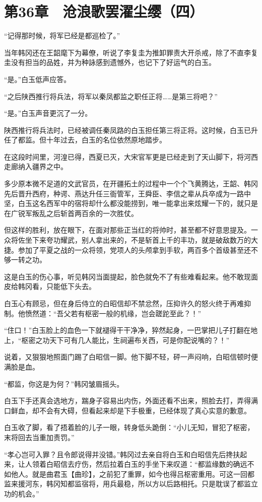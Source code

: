 \section{第36章　沧浪歌罢濯尘缨（四）}

“记得那时候，将军已经是都巡检了。”

当年韩冈还在王韶麾下为幕僚，听说了李复圭为推卸罪责大开杀戒，除了不直李复圭没有担当的品姓，并为种詠感到遗憾外，也记下了好运气的白玉。

“是。”白玉低声应答。

“之后陕西推行将兵法，将军以秦凤都监之职任正将……是第三将吧？”

“是。”白玉声音更沉了一分。

陕西推行将兵法时，已经被调任秦凤路的白玉担任第三将正将。这时候，白玉已升任了都监。但十年过去，白玉的名位依然原地踏步。

在这段时间里，河湟已得，西夏已灭，大宋官军更是已经走到了天山脚下，将河西走廊纳入疆界之中。

多少原本微不足道的文武官员，在开疆拓土的过程中一个个飞黄腾达，王韶、韩冈先后晋升西府，种谔、燕达升任三衙管军，王舜臣、李信之辈从兵卒成为一路中坚，白玉这名西军中的宿将却什么都没能捞到，唯一能拿出来炫耀一下的，就只是在广锐军叛乱之后斩首两百余的一次胜仗。

但这样的胜利，放在眼下，在面对那些正当红的将帅时，甚至都不好意思提及。一众将佐坐下来夸功耀武，别人拿出来的，不是斩首上千的丰功，就是破敌数万的大捷。参加了平夏之战的一众将领，党项人的头颅拿到手软，两百多个首级甚至还不够一转之功。

这是白玉的伤心事，听见韩冈当面提起，脸色就免不了有些难看起来。他不敢现面皮给韩冈看，只能低下头去。

白玉心有顾忌，但在身后侍立的白昭信却不禁忿然，压抑许久的怒火终于再难抑制。他愤然道：“吾父若有枢密一般的机缘，岂会蹉跎至此？！”

“住口！”白玉脸上的血色一下就褪得干干净净，猝然起身，一巴掌把儿子打翻在地上，“枢密之功天下可有几人能比，生祠遍布关西，可是你配说嘴的？！”

说着，又狠狠地照面门踢了白昭信一脚。他下脚不轻，砰一声闷响，白昭信顿时便满脸是血。

“都监，你这是为何？”韩冈皱眉摇头。

白玉下手还真会选地方，踹身子容易出内伤，外面还看不出来，照脸去打，弄得满口鲜血，却不会有大碍，但看起来却是下手极重，已经体现了真心实意的歉意。

白玉收了脚，看了捂着脸的儿子一眼，转身低头跪倒：“小儿无知，冒犯了枢密，末将回去当重加责罚。”

“孝心岂可入罪？且令郎说得并没错。”韩冈过去亲自将白玉和白昭信先后搀扶起来，让人领着白昭信去疗伤，然后拉着白玉的手坐下来叹道：“都监缘数的确远不如他人。就是曲君玉【曲珍】，之前犯了重罪，如今也得吕枢密重用。可这一回都监来援河东，韩冈知都监宿将，用兵最稳，所以方以后路相托。只是耽误了都监立功的机会。”

